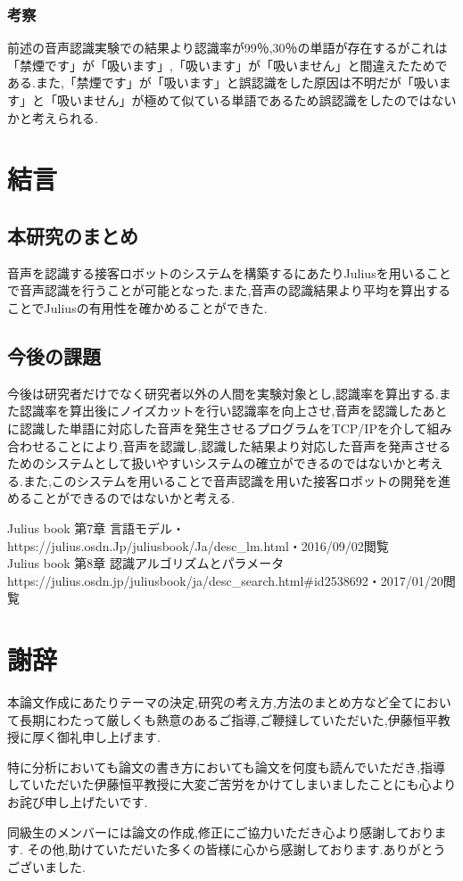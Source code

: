 \documentclass[12pt,oneside]{sotsuken_paper}
\begin{document}
\subsection{考察}
前述の音声認識実験での結果より認識率が99％,30％の単語が存在するがこれは「禁煙です」が「吸います」,「吸います」が「吸いません」と間違えたためである.また,「禁煙です」が「吸います」と誤認識をした原因は不明だが「吸います」と「吸いません」が極めて似ている単語であるため誤認識をしたのではないかと考えられる.



\chapter{結言}
\section{本研究のまとめ}
音声を認識する接客ロボットのシステムを構築するにあたりJuliusを用いることで音声認識を行うことが可能となった.また,音声の認識結果より平均を算出することでJuliusの有用性を確かめることができた.

\section{今後の課題}
今後は研究者だけでなく研究者以外の人間を実験対象とし,認識率を算出する.また認識率を算出後にノイズカットを行い認識率を向上させ,音声を認識したあとに認識した単語に対応した音声を発生させるプログラムをTCP/IPを介して組み合わせることにより,音声を認識し,認識した結果より対応した音声を発声させるためのシステムとして扱いやすいシステムの確立ができるのではないかと考える.また,このシステムを用いることで音声認識を用いた接客ロボットの開発を進めることができるのではないかと考える.


\begin{thebibliography}{9}
 Julius book 第7章 言語モデル・https://julius.osdn.Jp/juliusbook/Ja/desc\_lm.html・2016/09/02閲覧\\
 Julius book 第8章 認識アルゴリズムとパラメータ https://julius.osdn.jp/juliusbook/ja/desc_search.html#id2538692・2017/01/20閲覧\\
\end{thebibliography}

\chapter*{謝辞}
本論文作成にあたりテーマの決定,研究の考え方,方法のまとめ方など全てにおいて長期にわたって厳しくも熱意のあるご指導,ご鞭撻していただいた,伊藤恒平教授に厚く御礼申し上げます.


特に分析においても論文の書き方においても論文を何度も読んでいただき,指導していただいた伊藤恒平教授に大変ご苦労をかけてしまいましたことにも心よりお詫び申し上げたいです.


同級生のメンバーには論文の作成,修正にご協力いただき心より感謝しております.
その他,助けていただいた多くの皆様に心から感謝しております.ありがとうございました.
\end{document}
